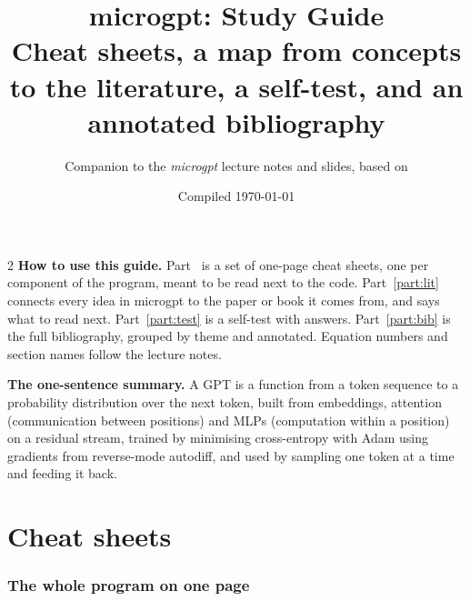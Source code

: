 \documentclass[10pt,letterpaper]{article}
\title{\vspace{-1.5em}\textbf{microgpt: Study Guide}\\[0.2em]\large Cheat sheets, a map from concepts to the literature, a self-test, and an annotated bibliography}
\author{Companion to the \emph{microgpt} lecture notes and slides, based on \textcite{karpathy2026microgpt}}
\date{Compiled \today}
\newcounter{q}
\begin{document}
\maketitle

\begin{multicols}{2}
\noindent\textbf{How to use this guide.}
Part~\ref{part:cheat} is a set of one-page cheat sheets, one per component of the program, meant to be read next to the code.
Part~\ref{part:lit} connects every idea in microgpt to the paper or book it comes from, and says what to read next.
Part~\ref{part:test} is a self-test with answers.
Part~\ref{part:bib} is the full bibliography, grouped by theme and annotated.
Equation numbers and section names follow the lecture notes.

\noindent\textbf{The one-sentence summary.}
A GPT is a function from a token sequence to a probability distribution over the next token, built from embeddings, attention (communication between positions) and MLPs (computation within a position) on a residual stream, trained by minimising cross-entropy with Adam using gradients from reverse-mode autodiff, and used by sampling one token at a time and feeding it back.
\end{multicols}

\tableofcontents

\clearpage
\part{Cheat sheets}
\label{part:cheat}

\section{The whole program on one page}
\end{document}
